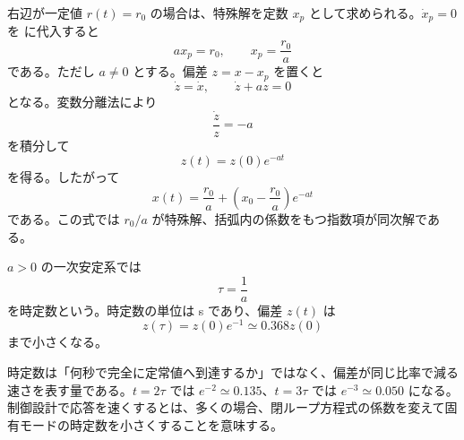 右辺が一定値 $r(t)=r_0$ の場合は、特殊解を定数 $x_p$ として求められる。$\dot{x}_p=0$ を  に代入すると
\begin{equation}
  a x_p=r_0,\qquad x_p=\frac{r_0}{a}
  \label{eq:first-order-particular-constant}
\end{equation}
である。ただし $a\ne0$ とする。偏差 $z=x-x_p$ を置くと
\begin{equation}
  \dot{z}=\dot{x},\qquad
  \dot{z}+a z=0
\end{equation}
となる。変数分離法により
\begin{equation}
  \frac{\dot{z}}{z}=-a
\end{equation}
を積分して
\begin{equation}
  z(t)=z(0)e^{-at}
\end{equation}
を得る。したがって
\begin{equation}
  x(t)=\frac{r_0}{a}+
  \left(x_0-\frac{r_0}{a}\right)e^{-at}
  \label{eq:first-order-constant-input-solution}
\end{equation}
である。この式では $r_0/a$ が特殊解、括弧内の係数をもつ指数項が同次解である。

\begin{definition}[時定数]
$a>0$ の一次安定系では
\begin{equation}
  \tau=\frac{1}{a}
\end{equation}
を時定数という。時定数の単位は s であり、偏差 $z(t)$ は
\begin{equation}
  z(\tau)=z(0)e^{-1}\simeq0.368z(0)
\end{equation}
まで小さくなる。
\end{definition}

時定数は「何秒で完全に定常値へ到達するか」ではなく、偏差が同じ比率で減る速さを表す量である。$t=2\tau$ では $e^{-2}\simeq0.135$、$t=3\tau$ では $e^{-3}\simeq0.050$ になる。制御設計で応答を速くするとは、多くの場合、閉ループ方程式の係数を変えて固有モードの時定数を小さくすることを意味する。

